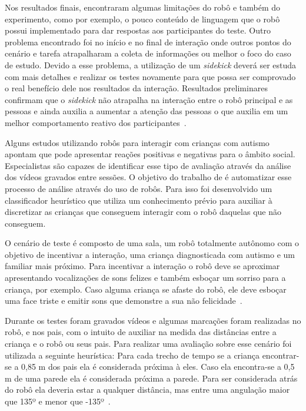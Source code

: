 Nos resultados finais,  encontraram algumas limitações do robô e também do experimento, como por exemplo, o pouco conteúdo de linguagem que o robô possui implementado para dar respostas aos participantes do teste. Outro problema encontrado foi no início e no final de interação onde outros pontos do cenário e tarefa atrapalharam a coleta de informações ou melhor o foco do caso de estudo. Devido a esse problema, a utilização de um \emph{sidekick} deverá ser estuda com mais detalhes e realizar os testes novamente para que possa ser comprovado o real benefício dele nos resultados da interação. Resultados preliminares confirmam que o \emph{sidekick} não atrapalha na interação entre o robô principal e as pessoas e ainda auxilia a aumentar a atenção das pessoas o que auxilia em um melhor comportamento reativo dos participantes~\cite{vazquez:2014}.

Alguns estudos utilizando robôs para interagir com crianças com autismo apontam que pode apresentar reações positivas e negativas para o âmbito social. Especialistas são capazes de identificar esse tipo de avaliação através da análise dos vídeos gravados entre sessões. O objetivo do trabalho de  é automatizar esse processo de análise através do uso de robôs. Para isso foi desenvolvido um classificador heurístico que utiliza um conhecimento prévio para auxiliar à discretizar as crianças que conseguem interagir com o robô daquelas que não conseguem.

O cenário de teste é composto de uma sala, um robô totalmente autônomo com o objetivo de incentivar a interação, uma criança diagnosticada com autismo e um familiar mais próximo. Para incentivar a interação o robô deve se aproximar apresentando vocalizações de sons felizes e também esboçar um sorriso para a criança, por exemplo. Caso alguma criança se afaste do robô, ele deve esboçar uma face triste e emitir sons que demonstre a sua não felicidade~\cite{feil-seifer:2010}.

Durante os testes foram gravados vídeos e algumas marcações foram realizadas no robô, e nos pais, com o intuito de auxiliar na medida das distâncias entre a criança e o robô ou seus pais. Para realizar uma avaliação sobre esse cenário foi utilizada a seguinte heurística: Para cada trecho de tempo se a criança encontrar-se a 0,85 m dos pais ela é considerada próxima à eles. Caso ela encontra-se a 0,5 m de uma parede ela é considerada próxima a parede. Para ser considerada atrás do robô ela deveria estar a qualquer distância, mas entre uma angulação maior que 135º e menor que -135º~\cite{feil-seifer:2010}.

